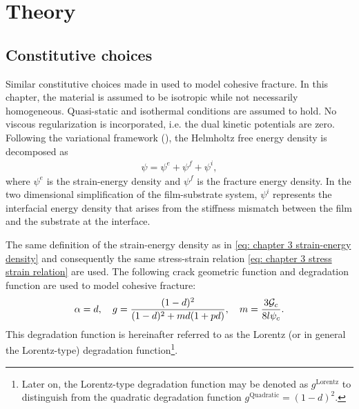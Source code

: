 \section{Theory}
\label{section: Chapter4/theory}

\subsection{Constitutive choices}

Similar constitutive choices made in  used to model cohesive fracture. In this chapter, the material is assumed to be isotropic while not necessarily homogeneous. Quasi-static and isothermal conditions are assumed to hold. No viscous regularization is incorporated, i.e. the dual kinetic potentials are zero. Following the variational framework (), the Helmholtz free energy density is decomposed as
\begin{align}
  \psi = \psi^e + \psi^f + \psi^i,
\end{align}
where $\psi^e$ is the strain-energy density and $\psi^f$ is the fracture energy density. In the two dimensional simplification of the film-substrate system, $\psi^i$ represents the interfacial energy density that arises from the stiffness mismatch between the film and the substrate at the interface.

The same definition of the strain-energy density as in \eqref{eq: chapter 3 strain-energy density} and consequently the same stress-strain relation \eqref{eq: chapter 3 stress strain relation} are used. The following crack geometric function and degradation function are used to model cohesive fracture:
\begin{align}
  \alpha = d, \quad g = \dfrac{(1-d)^2}{(1-d)^2+md(1+pd)}, \quad m = \dfrac{3 {\mathcal{G}_c}}{8 l \psi_c}.
\end{align}
This degradation function is hereinafter referred to as the Lorentz (or in general the Lorentz-type) degradation function\footnote{Later on, the Lorentz-type degradation function may be denoted as $g^\text{Lorentz}$ to distinguish from the quadratic degradation function $g^\text{Quadratic} = (1-d)^2$.}.

